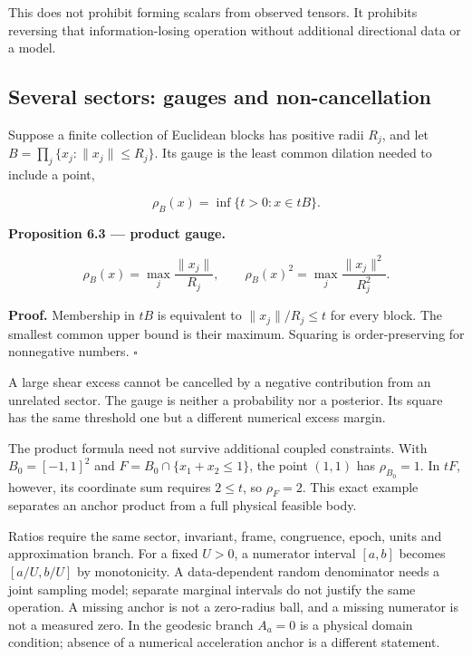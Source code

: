 \documentclass[
  11pt,
  a4paper]{article}
\begin{document}
This does not prohibit forming scalars from observed tensors. It prohibits reversing that information-losing operation without additional directional data or a model.

\hypertarget{several-sectors-gauges-and-non-cancellation}{%
\subsection{Several sectors: gauges and non-cancellation}\label{several-sectors-gauges-and-non-cancellation}}

Suppose a finite collection of Euclidean blocks has positive radii \(R_j\), and let \(B=\prod_j\{x_j:\|x_j\|\le R_j\}\). Its gauge is the least common dilation needed to include a point,

\[
\rho_B(x)=\inf\{t>0:x\in tB\}.
\tag{6.7}
\]

\textbf{Proposition 6.3 --- product gauge.}

\[
\rho_B(x)=\max_j\frac{\|x_j\|}{R_j},\qquad
\rho_B(x)^2=\max_j\frac{\|x_j\|^2}{R_j^2}.
\tag{6.8}
\]

\textbf{Proof.} Membership in \(tB\) is equivalent to \(\|x_j\|/R_j\le t\) for every block. The smallest common upper bound is their maximum. Squaring is order-preserving for nonnegative numbers. \(\square\)

A large shear excess cannot be cancelled by a negative contribution from an unrelated sector. The gauge is neither a probability nor a posterior. Its square has the same threshold one but a different numerical excess margin.

The product formula need not survive additional coupled constraints. With \(B_0=[-1,1]^2\) and \(F=B_0\cap\{x_1+x_2\le1\}\), the point \((1,1)\) has \(\rho_{B_0}=1\). In \(tF\), however, its coordinate sum requires \(2\le t\), so \(\rho_F=2\). This exact example separates an anchor product from a full physical feasible body.

Ratios require the same sector, invariant, frame, congruence, epoch, units and approximation branch. For a fixed \(U>0\), a numerator interval \([a,b]\) becomes \([a/U,b/U]\) by monotonicity. A data-dependent random denominator needs a joint sampling model; separate marginal intervals do not justify the same operation. A missing anchor is not a zero-radius ball, and a missing numerator is not a measured zero. In the geodesic branch \(A_a=0\) is a physical domain condition; absence of a numerical acceleration anchor is a different statement.

\clearpage
\end{document}
